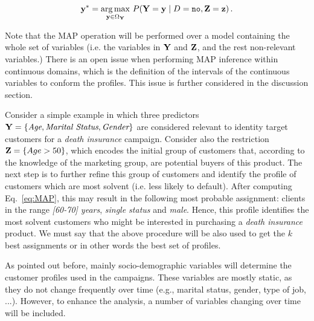 \begin{equation}
\mathbf{y}^{*} = \underset{\mathbf{y}\in\Omega_{\mathbf{Y}}} {\mathrm{arg\,max}} ~ P(\mathbf{Y}=\mathbf{y}\mid D = \texttt{no}, \mathbf{Z}=\mathbf{z})\, .
\label{eq:MAP}
\end{equation}

Note that the MAP operation will be performed over a model containing the whole set of variables (i.e. the variables in $\mathbf{Y}$ and $\mathbf{Z}$, and the rest non-relevant variables.) There is an open issue when performing MAP inference within continuous domains, which is the definition of the intervals of the continuous variables to conform the profiles. This issue is further considered in the discussion section. 

Consider a simple example in which three predictors $\mathbf{Y} = \{ \emph{Age}, \emph{Marital Status}, \emph{Gender}\}$ are considered relevant to identity target customers for a \textit{death insurance} campaign. Consider also the restriction $\mathbf{Z} = \{Age>50\}$, which encodes the initial group of customers that, according to the knowledge of the marketing group, are potential buyers of this product.  The next step is to further refine this group of customers and identify the profile of customers which are most solvent (i.e. less likely to default). After computing Eq.~\ref{eq:MAP}, this may result in the following most probable assignment: clients in the range \emph {[60-70] years}, \emph{single status} and \emph{male}. Hence, this profile identifies the most solvent customers who might be interested in purchasing a \emph{death insurance} product. We must say that the above  procedure will be also used to get the $k$ best assignments or in other words the best set of profiles.   


As pointed out before, mainly socio-demographic variables will determine the customer profiles used in the campaigns. These variables are mostly static, as they do not change frequently over time (e.g., marital status, gender, type of job, ...). However, to enhance the analysis, a number of  variables changing over time will be included. 

